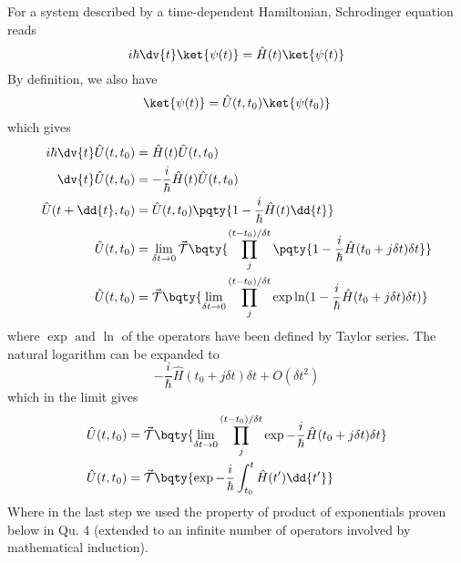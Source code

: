 \documentclass[12pt]{article}
\begin{document}
\subsection{} For a system described by a time-dependent Hamiltonian, Schrodinger equation reads \[
    i\hbar \dv{t} \ket{\psi(t)} = \hat{H}(t) \ket{\psi(t)} 
\]
By definition, we also have \[
    \ket{\psi(t)} = \hat{U}(t, t_0)\ket{\psi(t_0)} 
\]
which gives \begin{align*}
    i\hbar\dv{t}\hat{U}(t, t_0) &=  \hat{H}(t)\hat{U}(t,t_0)\\
    \dv{t}\hat{U}(t, t_0)&= - \frac{i}{\hbar} \hat{H}(t)\hat{U}(t,t_0)\\
    \hat{U}(t + \dd{t}, t_0)&= \hat{U}(t, t_0) \pqty{1 - \frac{i}{\hbar} \hat{H}(t)\dd{t}}\\
    \hat{U}(t, t_0)&= \lim_{\delta t \to 0}\vec{\mathcal{T}}\bqty{\prod^{(t - t_0)/\delta t}_{j} \pqty{1 - \frac{i}{\hbar} \hat{H}(t_0+ j\delta t)\delta t}}\\
    \hat{U}(t, t_0)&= \vec{\mathcal{T}}\bqty{\lim_{\delta t \to 0}\prod^{(t - t_0)/\delta t}_{j} \exp{\ln(1 - \frac{i}{\hbar} \hat{H}(t_0 +j\delta t)\delta t)}}
\end{align*}
where \(\exp \text{ and } \ln\) of the operators have been defined by Taylor series. The natural logarithm can be expanded to \[ - \frac{i}{\hbar} \hat{H}(t_0 +j\delta t)\delta t + O(\delta t^2)\]
which in the limit gives
\begin{align*}
    \hat{U}(t, t_0)&= \vec{\mathcal{T}}\bqty{\lim_{\delta t \to 0}\prod^{(t - t_0)/\delta t}_{j} \exp{ - \frac{i}{\hbar} \hat{H}(t_0 +j\delta t)\delta t}}\\
    \hat{U}(t, t_0)&= \vec{\mathcal{T}}\bqty{\exp{ - \frac{i}{\hbar} \int_{t_0}^t \hat{H}(t')\dd{t'}}}
\end{align*}
Where in the last step we used the property of product of exponentials proven below in Qu. 4 (extended to an infinite number of operators involved by mathematical induction).
\end{document}
